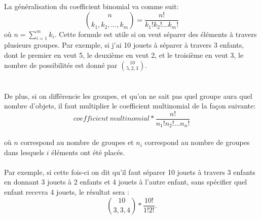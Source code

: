 \documentclass[10pt, french]{article}
\begin{document}
\begin{multicols*}{2}
\begin{definitionNOHFILL}
La généralisation du coefficient binomial va comme suit:\\ $$\binom{n}{k_1, k_2, \dots, k_m} = \frac{n!}{k_1! k_2!  \dots k_m!}$$ où $n = \sum_{i = 1}^{m} k_i$. Cette formule est utile si on veut séparer des éléments à travers plusieurs groupes. Par exemple, si j'ai 10 jouets à séparer à travers 3 enfants, dont le premier en veut 5, le deuxième en veut 2, et le troisième en veut 3, le nombre de possibilités est donné par $\binom{10}{5, 2, 3}.$ \\
\\
\\
De plus, si on différencie les groupes, et qu'on ne sait pas quel groupe aura quel nombre d'objets, il faut multiplier le coefficient multinomial de la façon suivante: 
$$ coefficient\ multinomial * \frac{n!}{n_1! n_2! \dots n_n!}$$\\ où $n$ correspond au nombre de groupes et $n_i$ correspond au nombre de groupes dans lesquels $i$ éléments ont été placés. \\
\\
Par exemple, si cette fois-ci on dit qu'il faut séparer 10 jouets à travers 3 enfants en donnant 3 jouets à 2 enfants et 4 jouets à l'autre enfant, sans spécifier quel enfant recevra 4 jouets, le résultat sera :\\ $$ \binom{10}{3, 3, 4} * \frac{10!}{1!2!}.$$
\end{definitionNOHFILL}






\end{multicols*}
\end{document}
